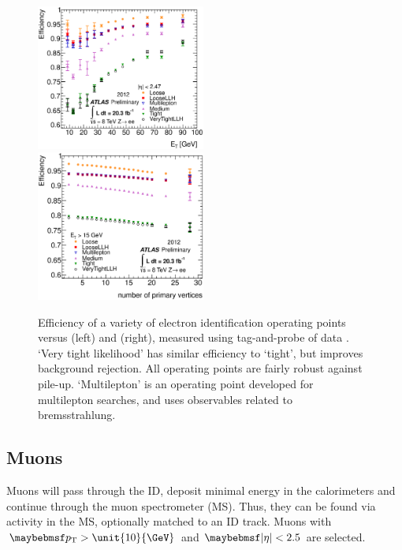 \begin{description}
	\begin{figure}
		\includegraphics[width=0.495\textwidth]{tex/selection/el_ideff_et}
		\hfill
		\includegraphics[width=0.495\textwidth]{tex/selection/el_ideff_npv}
		\caption{Efficiency of a variety of electron identification operating points 
		versus \et (left) and \npv (right), measured using tag-and-probe of 
		\HepProcess{\PZ \HepTo \Pe\Pe} data \cite{ElectronPerf:2012}. `Very tight 
		likelihood' has similar efficiency to `tight', but improves background rejection. 
		All operating points are fairly robust against pile-up. `Multilepton' is an 
		operating point developed for multilepton searches, and uses observables related to 
		bremsstrahlung.}
		\label{fig:objects:el_ideff}
	\end{figure}

\end{description}



\clearpage
\subsection{Muons}
\label{sec:objects:muons}

Muons will pass through the ID, deposit minimal energy in the calorimeters and 
continue through the muon spectrometer (MS). Thus, they can be found via activity in the 
MS, optionally matched to an ID track. Muons with $\pt > \unit{10}{\GeV}$ and 
$\mods{\eta} < 2.5$ are selected.

